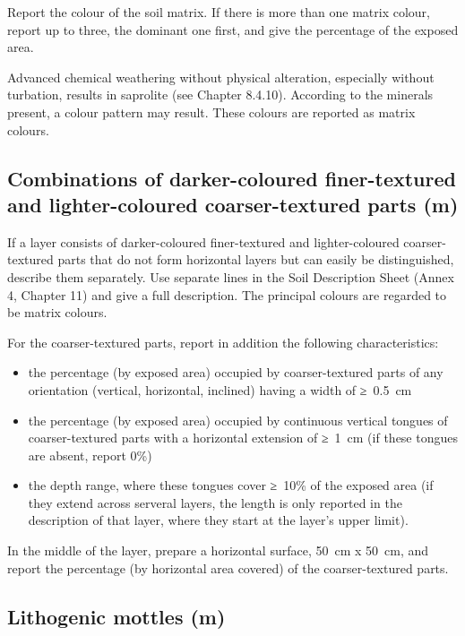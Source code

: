 \documentclass[
  letterpaper,
  DIV=11,
  numbers=noendperiod]{scrreprt}
\providecommand{\tightlist}{%
  \setlength{\itemsep}{0pt}\setlength{\parskip}{0pt}}\usepackage{longtable,booktabs,array}
\begin{document}
Report the colour of the soil matrix. If there is more than one matrix
colour, report up to three, the dominant one first, and give the
percentage of the exposed area.

Advanced chemical weathering without physical alteration, especially
without turbation, results in saprolite (see Chapter 8.4.10). According
to the minerals present, a colour pattern may result. These colours are
reported as matrix colours.

\hypertarget{combinations-of-darker-coloured-finer-textured-and-lighter-coloured-coarser-textured-parts-m}{%
\subsection{Combinations of darker-coloured finer-textured and
lighter-coloured coarser-textured parts
(m)}\label{combinations-of-darker-coloured-finer-textured-and-lighter-coloured-coarser-textured-parts-m}}

If a layer consists of darker-coloured finer-textured and
lighter-coloured coarser-textured parts that do not form horizontal
layers but can easily be distinguished, describe them separately. Use
separate lines in the Soil Description Sheet (Annex 4, Chapter 11) and
give a full description. The principal colours are regarded to be matrix
colours.

For the coarser-textured parts, report in addition the following
characteristics:

\begin{itemize}
\tightlist
\item
  the percentage (by exposed area) occupied by coarser-textured parts of
  any orientation (vertical, horizontal, inclined) having a width of
  ≥~0.5~cm
\item
  the percentage (by exposed area) occupied by continuous vertical
  tongues of coarser-textured parts with a horizontal extension of
  ≥~1~cm (if these tongues are absent, report 0\%)
\item
  the depth range, where these tongues cover ≥~10\% of the exposed area
  (if they extend across serveral layers, the length is only reported in
  the description of that layer, where they start at the layer's upper
  limit).
\end{itemize}

In the middle of the layer, prepare a horizontal surface, 50~cm x 50~cm,
and report the percentage (by horizontal area covered) of the
coarser-textured parts.

\hypertarget{lithogenic-mottles-m}{%
\subsection{Lithogenic mottles (m)}\label{lithogenic-mottles-m}}
\end{document}
